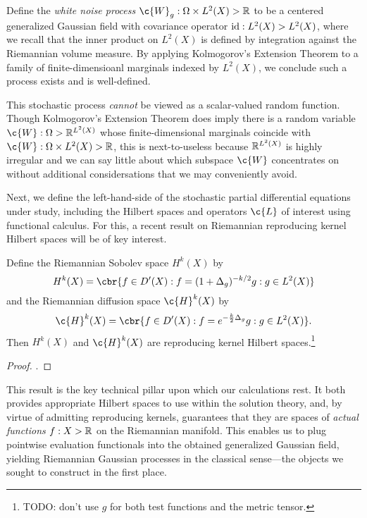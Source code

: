 \documentclass[11pt]{book}
\begin{document}
\begin{definition}
Define the \emph{white noise process} $\c{W}_g : \Omega \x L^2(X) \-> \R$ to be a centered generalized Gaussian field with covariance operator $\operatorname{id} : L^2(X) \-> L^2(X)$, where we recall that the inner product on $L^2(X)$ is defined by integration against the Riemannian volume measure.
By applying Kolmogorov's Extension Theorem to a family of finite-dimensioanl marginals indexed by $L^2(X)$, we conclude such a process exists and is well-defined.
\end{definition}

This stochastic process \emph{cannot} be viewed as a scalar-valued random function.
Though Kolmogorov's Extension Theorem does imply there is a random variable $\c{W} : \Omega \-> \R^{L^2(X)}$ whose finite-dimensional marginals coincide with $\c{W} : \Omega \x L^2(X) \-> \R$, this is next-to-useless because $\mathbb{R}^{L^2(X)}$ is highly irregular and we can say little about which subspace $\c{W}$ concentrates on without additional considersations that we may conveniently avoid.

Next, we define the left-hand-side of the stochastic partial differential equations under study, including the Hilbert spaces and operators $\c{L}$ of interest using functional calculus.
For this, a recent result on Riemannian reproducing kernel Hilbert spaces will be of key interest.

\begin{result}
Define the Riemannian Sobolev space $H^k(X)$ by
\[
H^k(X) = \cbr{f \in D'(X) : f = (1 + \lap_g)^{-k/2} g : g \in L^2(X)}
\]
and the Riemannian diffusion space $\c{H}^k(X)$ by
\[
\c{H}^k(X) = \cbr{f \in D'(X) : f = e^{-\frac{k}{2}\lap_g} g : g \in L^2(X)}
.
\]
Then $H^k(X)$ and $\c{H}^k(X)$ are reproducing kernel Hilbert spaces.\footnote{TODO: don't use $g$ for both test functions and the metric tensor.}
\end{result}

\begin{proof}
\textcite[Theorem 3 and Theorem 6]{devito20}.
\end{proof}

This result is the key technical pillar upon which our calculations rest.
It both provides appropriate Hilbert spaces to use within the solution theory, and, by virtue of admitting reproducing kernels, guarantees that they are spaces of \emph{actual functions} $f : X \-> \mathbb{R}$ on the Riemannian manifold.
This enables us to plug pointwise evaluation functionals into the obtained generalized Gaussian field, yielding Riemannian Gaussian processes in the classical sense---the objects we sought to construct in the first place.
\end{document}
